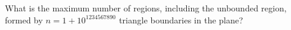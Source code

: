 What is the maximum number of regions, including the unbounded region, formed by $n=1+10^{1234567890}$ triangle boundaries in the plane?
